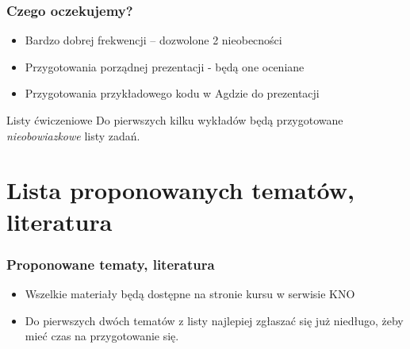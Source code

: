 \documentclass{beamer}
\begin{document}
\begin{frame}

\frametitle{Czego oczekujemy?}

\begin{itemize}
\item Bardzo dobrej frekwencji -- dozwolone 2 nieobecności \pause

\item Przygotowania porządnej prezentacji - będą one oceniane \pause

\item Przygotowania przykładowego kodu w Agdzie do prezentacji \pause

\end{itemize}

\begin{block}{Listy ćwiczeniowe}
Do pierwszych kilku wykładów będą przygotowane \emph{nieobowiazkowe} listy zadań.
\end{block}








\end{frame}

\section{Lista proponowanych tematów, literatura}

\begin{frame}

\frametitle{Proponowane tematy, literatura}

\begin{itemize}

\item Wszelkie materiały będą dostępne na stronie kursu w serwisie KNO \pause
\item Do pierwszych dwóch tematów z listy najlepiej zgłaszać się już niedługo, 
żeby mieć czas na przygotowanie się.

\end{itemize}

\end{frame}
\end{document}
